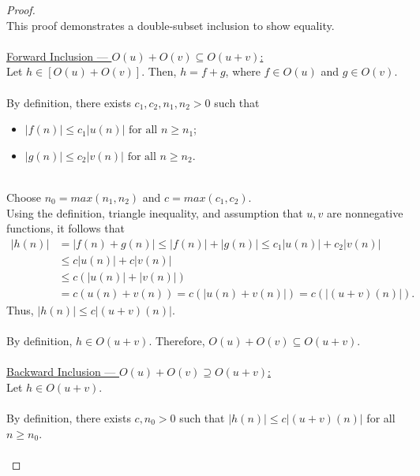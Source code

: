 \documentclass[12pt]{article}
\begin{document}
\begin{proof}
\leavevmode\\
    This proof demonstrates a double-subset inclusion to show equality. \\
    \\
    \underline{Forward Inclusion — \(O(u) + O(v) \subseteq O(u + v)\):} \\
    Let \( h \in [O(u) + O(v)] \). Then, \( h = f + g \), where \( f \in O(u) \) and \( g \in O(v) \). \\
    \\
    By definition, there exists \( c_1, c_2, n_1, n_2 > 0 \) such that
    \begin{itemize}
        \item \( |f(n)| \leq c_1|u(n)| \text{ for all } n \geq n_1 \);
        \item \( |g(n)| \leq c_2|v(n)| \text{ for all } n \geq n_2 \).
    \end{itemize}
    \leavevmode\\
    Choose \( n_0 = max(n_1, n_2) \) and \( c = max(c_1, c_2) \). \\
    Using the definition, triangle inequality, and assumption that \( u, v \) are nonnegative functions, it follows that
    \begin{equation*}
        \begin{aligned}
            |h(n)| &= |f(n) + g(n)| \leq |f(n)| + |g(n)| \leq c_1|u(n)| + c_2|v(n)| \\
            &\leq c|u(n)| + c|v(n)| \\
            &\leq c(|u(n)| + |v(n)|) \\
            &= c(u(n) + v(n)) = c(|u(n) + v(n)|) = c(|(u + v)(n)|) \text{.}
        \end{aligned}
    \end{equation*}
    Thus, \( |h(n)| \leq c|(u + v)(n)| \). \\
    \\
    By definition, \( h \in O(u + v) \). Therefore, \( O(u) + O(v) \subseteq O(u + v) \). \\
    \\
    \underline{Backward Inclusion — \(O(u) + O(v) \supseteq O(u + v)\):} \\
    Let \( h \in O(u + v) \). \\
    \\
    By definition, there exists \( c, n_0 > 0 \) such that \( |h(n)| \leq c|(u + v)(n)| \) for all \( n \geq n_0 \). \\
    \\

\end{proof}
\end{document}
